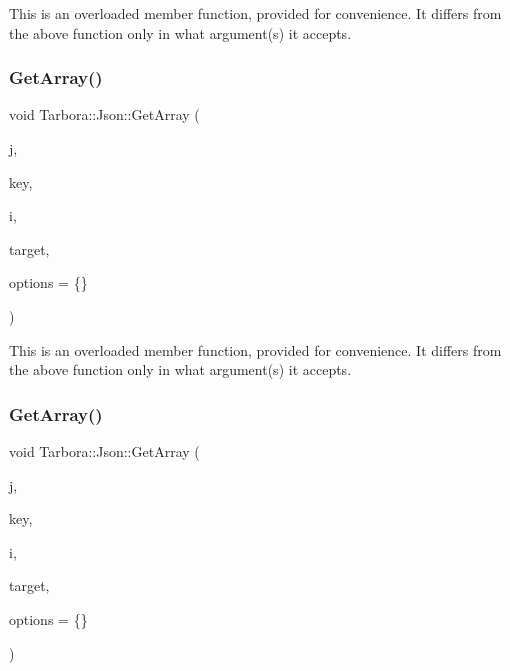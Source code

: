 This is an overloaded member function, provided for convenience. It differs from the above function only in what argument(s) it accepts. \mbox{\label{classTarbora_1_1Json_a1ceb9a588f925ed34406dde97d068cad}} 
\subsubsection{\texorpdfstring{Get\+Array()}{GetArray()}\hspace{0.1cm}{\footnotesize\ttfamily [11/12]}}
{\footnotesize\ttfamily void Tarbora\+::\+Json\+::\+Get\+Array (\begin{DoxyParamCaption}\item[{raw\+\_\+json}]{j,  }\item[{const char $\ast$}]{key,  }\item[{int}]{i,  }\item[{unsigned int $\ast$}]{target,  }\item[{\hyperlink{structTarbora_1_1JsonOptions}{Json\+Options}}]{options = {\ttfamily \{\}} }\end{DoxyParamCaption})}

This is an overloaded member function, provided for convenience. It differs from the above function only in what argument(s) it accepts. \mbox{\label{classTarbora_1_1Json_ad135d29bb8d9338a026a2a6f71bcfc47}} 
\subsubsection{\texorpdfstring{Get\+Array()}{GetArray()}\hspace{0.1cm}{\footnotesize\ttfamily [12/12]}}
{\footnotesize\ttfamily void Tarbora\+::\+Json\+::\+Get\+Array (\begin{DoxyParamCaption}\item[{raw\+\_\+json}]{j,  }\item[{const char $\ast$}]{key,  }\item[{int}]{i,  }\item[{std\+::string $\ast$}]{target,  }\item[{\hyperlink{structTarbora_1_1JsonOptions}{Json\+Options}}]{options = {\ttfamily \{\}} }\end{DoxyParamCaption})}


